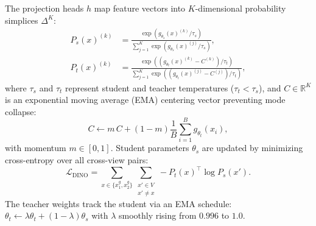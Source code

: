 \documentclass[11pt,a4paper]{article}
\begin{document}
The projection heads $h$ map feature vectors into $K$-dimensional probability simplices $\Delta^K$:
\begin{align}
P_s(x)^{(k)} &= \frac{\exp\left(g_{\theta_s}(x)^{(k)} / \tau_s\right)}{\sum_{j=1}^K \exp\left(g_{\theta_s}(x)^{(j)} / \tau_s\right)}, \label{eq:student_prob} \\
P_t(x)^{(k)} &= \frac{\exp\left((g_{\theta_t}(x)^{(k)} - C^{(k)}) / \tau_t\right)}{\sum_{j=1}^K \exp\left((g_{\theta_t}(x)^{(j)} - C^{(j)}) / \tau_t\right)}, \label{eq:teacher_prob}
\end{align}
where $\tau_s$ and $\tau_t$ represent student and teacher temperatures ($\tau_t < \tau_s$), and $C \in \mathbb{R}^K$ is an exponential moving average (EMA) centering vector preventing mode collapse:
\begin{equation}
C \leftarrow m \, C + (1 - m) \frac{1}{B} \sum_{i=1}^B g_{\theta_t}(x_i),
\label{eq:centering_update}
\end{equation}
with momentum $m \in [0, 1]$. Student parameters $\theta_s$ are updated by minimizing cross-entropy over all cross-view pairs:
\begin{equation}
\mathcal{L}_{\text{DINO}} = \sum_{x \in \{x_1^g, x_2^g\}} \sum_{\substack{x' \in V \\ x' \neq x}} - P_t(x)^\top \log P_s(x').
\label{eq:dino_loss}
\end{equation}
The teacher weights track the student via an EMA schedule: $\theta_t \leftarrow \lambda \theta_t + (1 - \lambda)\theta_s$ with $\lambda$ smoothly rising from $0.996$ to $1.0$.
\end{document}
